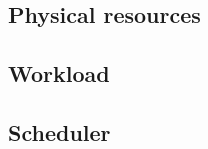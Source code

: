 

\subsection{Physical resources} \label{simulator_cell}


\subsection{Workload} \label{workload}


\subsection{Scheduler} \label{scheduler}
